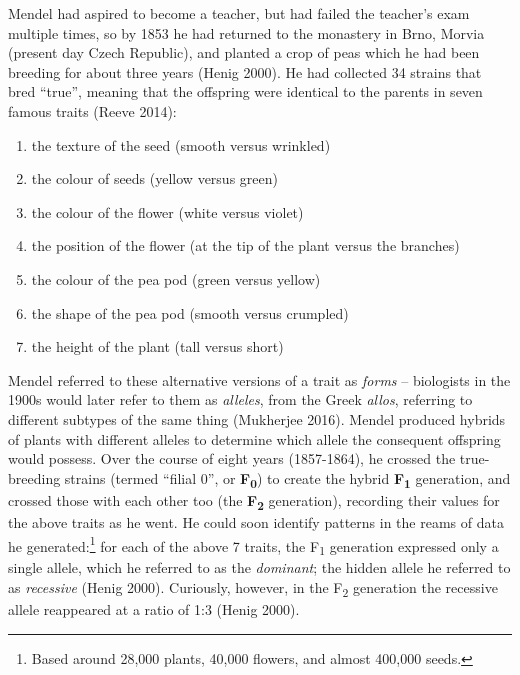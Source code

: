 \documentclass[
]{book}
\begin{document}
Mendel had aspired to become a teacher, but had failed the teacher's exam multiple times, so by 1853 he had returned to the monastery in Brno, Morvia (present day Czech Republic), and planted a crop of peas which he had been breeding for about three years (Henig 2000). He had collected 34 strains that bred ``true'', meaning that the offspring were identical to the parents in seven famous traits (Reeve 2014):

\begin{enumerate}
\def\labelenumi{\arabic{enumi}.}
\item
  the texture of the seed (smooth versus wrinkled)
\item
  the colour of seeds (yellow versus green)
\item
  the colour of the flower (white versus violet)
\item
  the position of the flower (at the tip of the plant versus the branches)
\item
  the colour of the pea pod (green versus yellow)
\item
  the shape of the pea pod (smooth versus crumpled)
\item
  the height of the plant (tall versus short)
\end{enumerate}

Mendel referred to these alternative versions of a trait as \emph{forms} -- biologists in the 1900s would later refer to them as \emph{alleles}, from the Greek \emph{allos}, referring to different subtypes of the same thing (Mukherjee 2016). Mendel produced hybrids of plants with different alleles to determine which allele the consequent offspring would possess. Over the course of eight years (1857-1864), he crossed the true-breeding strains (termed ``filial 0'', or \textbf{F\textsubscript{0}}) to create the hybrid \textbf{F\textsubscript{1}} generation, and crossed those with each other too (the \textbf{F\textsubscript{2}} generation), recording their values for the above traits as he went. He could soon identify patterns in the reams of data he generated:\footnote{Based around 28,000 plants, 40,000 flowers, and almost 400,000 seeds.} for each of the above 7 traits, the F\textsubscript{1} generation expressed only a single allele, which he referred to as the \emph{dominant}; the hidden allele he referred to as \emph{recessive} (Henig 2000). Curiously, however, in the F\textsubscript{2} generation the recessive allele reappeared at a ratio of 1:3 (Henig 2000).
\end{document}
